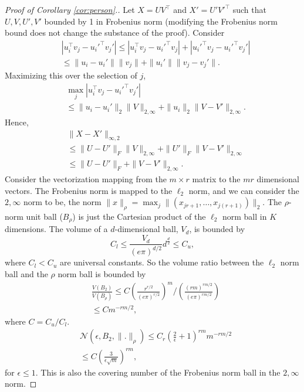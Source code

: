 \documentclass{article}
\begin{document}
\begin{proof}[Proof of Corollary \ref{cor:person}.]
Let $X = U V^\top$ and $X' = U' V'^\top$ such that $U,V,U',V'$ bounded by 1 in Frobenius norm (modifying the Frobenius norm bound does not change the substance of the proof).
Consider
\begin{align*}
&|u_i^\top v_j - u_i'^\top v_j'| \le |u_i^\top v_j - u_i'^\top v_j| + |u_i'^\top v_j - u_i'^\top v_j'| \\
&\le \| u_i - u_i' \| \| v_j \| + \| u_i' \| \| v_j - v_j' \|.
\end{align*}
Maximizing this over the selection of $j$,
\begin{align*}
&\max_j |u_i^\top v_j - u_i'^\top v_j'| \\
&\le \| u_i - u_i' \|_2 \| V \|_{2,\infty} + \| u_i \|_2 \| V - V' \|_{2,\infty}.
\end{align*}
Hence,
\begin{align*}
&\| X - X' \|_{\infty, 2} \\
&\le \| U - U' \|_F \| V \|_{2,\infty} + \| U' \|_F \| V - V' \|_{2,\infty} \\
&\le \| U - U' \|_F + \| V - V' \|_{2,\infty}.
\end{align*}
Consider the vectorization mapping from the $m \times r$ matrix to the $mr$ dimensional vectors.  The Frobenius norm is mapped to the $\ell_2$ norm, and we can consider the $2,\infty$ norm to be, the norm $\| x \|_\rho = \max_{j} \| (x_{jr+1},\ldots,x_{j(r+1)}) \|_2$.
The $\rho$-norm unit ball ($B_\rho$) is just the Cartesian product of the $\ell_2$ norm ball in $K$ dimensions.
The volume of a $d$-dimensional ball, $V_{d}$, is bounded by
$$
C_l \le \frac{V_d}{(e \pi)^{d/2}} d^{\frac d2} \le C_u,
$$
where $C_l < C_u$ are universal constants.
So the volume ratio between the $\ell_2$ norm ball and the $\rho$ norm ball is bounded by
\begin{align*}
&\frac{V(B_2)}{V(B_\rho)} \le C \left( \frac{{r}^{r / 2}}{(e \pi)^{r/2}} \right)^{m} \big/ \left( \frac{{(rm)}^{rm / 2}}{(e \pi)^{rm/2}} \right)\\
&\le C m^{- rm/2},
\end{align*}
where $C = C_u / C_l$.
\begin{align*}
&\mathcal N(\epsilon,B_2,\| . \|_\rho) \le C_r \left( \frac 2\epsilon + 1 \right)^{rm} m^{- rm/2} \\
&\le C \left( \frac{3}{\epsilon \sqrt m} \right)^{rm},
\end{align*}
for $\epsilon \le 1$.  This is also the covering number of the Frobenius norm ball in the $2,\infty$ norm.

\end{proof}
\end{document}
